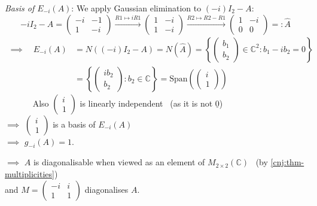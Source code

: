 \documentclass[
  12pt,
  a4paper,
  twoside]{article}
\theoremstyle{plain}
\theoremstyle{definition}
\begin{document}
\emph{Basis of \(E_{-i}(A)\)}: We apply Gaussian elimination to \((-i)I_2-A\):
\[
-iI_{2} - A = \begin{pmatrix} -i & -1 \\ 1 & -i \end{pmatrix}
\xrightarrow{R1 \mapsto iR1}
\begin{pmatrix} 1 & -i \\ 1 & -i \end{pmatrix}
\xrightarrow{R2 \mapsto R2 -R1}
\begin{pmatrix} 1 & -i \\ 0 & 0 \end{pmatrix} =: \hat A
\]
\begin{align*}
\implies\quad  E_{-i}(A) &= N((-i)I_2-A) = N(\hat A) = \left\{ \begin{pmatrix} b_{1} \\ b_{2} \end{pmatrix} \in \mathbb{C}^{2} : b_{1} - i b_{2} = 0 \right\}\\
&= \left\{ \begin{pmatrix} ib_{2} \\ b_{2} \end{pmatrix} : b_{2} \in \mathbb{C} \right\} = \mathrm{Span} \left( \begin{pmatrix} i \\ 1 \end{pmatrix} \right)
\end{align*}
~~~~~~ Also \(\begin{pmatrix}i\\1\end{pmatrix}\) is linearly independent
\hfill~{(as it is not \(\underline{0}\))}\\
\(\implies\) \(\begin{pmatrix}i\\1\end{pmatrix}\) is a basis of \(E_{-i}(A)\)\\
\(\implies\) \(g_{-i}(A) = 1\).

\(\implies\) \(A\) is diagonalisable when viewed as an element of \(M_{2 \times 2}(\mathbb{C})\)
\hfill~{(by \ref{cnj:thm-multiplicities})}\\
\hspace*{0.333em}\hspace*{0.333em}\hspace*{0.333em}\hspace*{0.333em}\hspace*{0.333em}\hspace*{0.333em}\hspace*{0.333em}\hspace*{0.333em}\hspace*{0.333em}\hspace*{0.333em}\hspace*{0.333em}\hspace*{0.333em} and \(M = \begin{pmatrix} -i & i \\ 1 & 1 \end{pmatrix}\) diagonalises \(A\).
\end{document}
